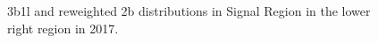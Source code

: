 \begin{figure}[ht]
 
 
    \caption{3b1l and reweighted 2b distributions in Signal Region in the lower right region in 2017.}
    \label{fig:lower-right-3b1l-SR-2017}
\end{figure}


